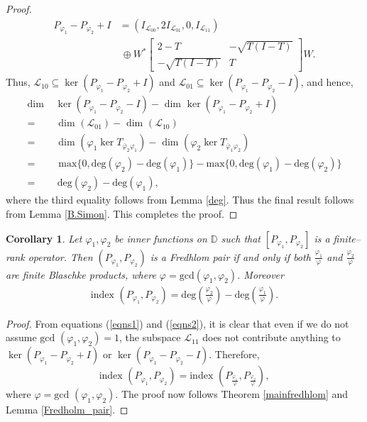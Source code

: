 \documentclass[12pt, a4 paper]{amsart}
\newcommand{\cll}{\mathcal{L}}
\newcommand{\D}{\mathbb{D}}
\theoremstyle{definition}
\theoremstyle{plain}
\newtheorem{cor}[thm]{Corollary}
\theoremstyle{definition}
\numberwithin{equation}{section}
\let\phi=\varphi
\begin{document}
\begin{proof}
        \begin{equation}\label{eqns2}
        \begin{split}
        {P_{\phi_1}-P_{\phi_2}+I}&=(I_{\cll_{00}},2I_{\cll_{01}},0,I_{\cll_{11}})\\&~\oplus {W}^*\begin{bmatrix}
            {2-T} & {-\sqrt{T(I-T)}}\\
            {-\sqrt{T(I-T)}} & {T}
        \end{bmatrix}{W}.
        \end{split}
        \end{equation}
        Thus, $\cll_{10} \subseteq \ker ( P_{\phi_1} - P_{\phi_2} + I)$ and $\cll_{01} \subseteq \ker ( P_{\phi_1} - P_{\phi_2} - I)$, and hence,
\begin{align*}
            \text{dim }&\ker({P_{\phi_1}-P_{\phi_2}-I})-\text{ dim }\ker({P_{\phi_1}-P_{\phi_2}+I})\\
            =&\text{ dim }(\cll_{01})-\text{ dim }(\cll_{10})\\
             =&\text{ dim }(\phi_1 \ker T_{\bar \phi_2 \phi_1} )- \text{ dim }(\phi_2 \ker T_{\bar \phi_1 \phi_2})\\
            =&\text{ max}\{0,\text{deg}(\phi_2)-\text{deg}(\phi_1)\}-\text{max}\{0,\text{deg}(\phi_1)-\text{deg}(\phi_2)\}\\
            =&~\text{deg}(\phi_2)-\text{deg}(\phi_1),
\end{align*}
where the third equality follows from Lemma \ref{deg}. Thus the final result follows from Lemma \ref{B.Simon}.  This completes the proof.
\end{proof}
\begin{cor}\label{lastfredhlom}
Let $\phi_1,\phi_2$ be inner functions on $\D$ such that $[P_{\phi_1},P_{\phi_2}]$ is a finite--rank operator. Then $(P_{\phi_1},P_{\phi_2})$ is a Fredhlom pair if and only if both $\frac{\phi_1}{\phi}$ and $\frac{\phi_2}{\phi}$ are finite Blaschke products, where $\phi=\mbox{gcd}(\phi_1,\phi_2)$.  Moreover 
\begin{align*}
        \text{index }(P_{\phi_1},P_{\phi_2})=\mbox{deg}(\tfrac{\phi_2}{\phi})-\text{deg}(\tfrac{\phi_1}{\phi}).
    \end{align*}
\end{cor}
\begin{proof}
From equations (\ref{eqns1}) and (\ref{eqns2}), it is clear that even if we do not assume $\mbox{gcd }(\phi_1, \phi_2)=1$, the subspace $\cll_{11}$ does not contribute anything to $\ker ( P_{\phi_1} - P_{\phi_2} + I)$ or $\ker ( P_{\phi_1} - P_{\phi_2} - I)$. Therefore, 
\[
\mbox{index }(P_{\phi_1}, P_{\phi_2}) = \mbox{index }(P_{\frac{\phi_1}{\phi}}, P_{\frac{\phi_2}{\phi}}),
\]
where $\phi = \mbox{gcd }(\phi_1, \phi_2)$. The proof now follows Theorem \ref{mainfredhlom} and Lemma \ref{Fredholm_pair}.
\end{proof}
 
\end{document}
